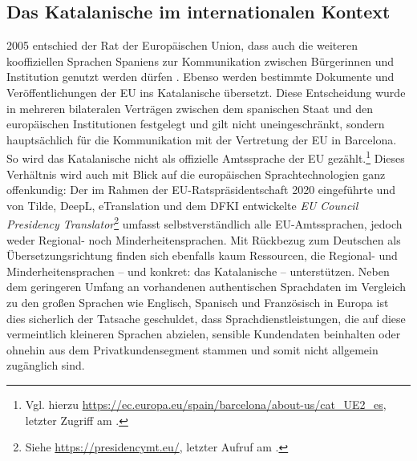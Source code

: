 
\subsection{Das Katalanische im internationalen Kontext}
\label{K2:subsec:KatInt}\largerpage


2005 entschied der Rat der Europäischen Union, dass auch die weiteren kooffiziellen Sprachen Spaniens zur Kommunikation zwischen Bürger{\textperiodcentered}innen und Institution genutzt werden dürfen \citep[11]{moreno_llengua_2012}. Ebenso werden bestimmte Dokumente und Veröffentlichungen der EU ins Katalanische übersetzt. Diese Entscheidung wurde in mehreren bilateralen Verträgen zwischen dem spanischen Staat und den europäischen Institutionen festgelegt und gilt nicht uneingeschränkt, sondern hauptsächlich für die Kommunikation mit der Vertretung der EU in Barcelona. So wird das Katalanische nicht als offizielle Amtssprache der EU gezählt.\footnote{Vgl. hierzu \url{https://ec.europa.eu/spain/barcelona/about-us/cat_UE2_es}, letzter Zugriff am \datum{}.} Dieses Verhältnis wird auch mit Blick auf die europäischen Sprachtechnologien ganz offenkundig: Der im Rahmen der EU-Ratspräsidentschaft 2020 eingeführte und von Tilde, DeepL, eTranslation und dem DFKI entwickelte \emph{EU Council Presidency Translator}\footnote{Siehe \url{https://presidencymt.eu/}, letzter Aufruf am \datum{}.} umfasst selbstverständlich alle EU-Amtssprachen, jedoch weder Regional- noch Minderheitensprachen. Mit Rückbezug zum Deutschen als Übersetzungsrichtung finden sich ebenfalls kaum Ressourcen, die Re\-gio\-nal- und Minderheitensprachen -- und konkret: das Katalanische -- unterstützen. Neben dem geringeren Umfang an vorhandenen authentischen Sprachdaten im Vergleich zu den \glqq großen\grqq{} Sprachen wie Englisch, Spanisch und Französisch in Europa ist dies sicherlich der Tatsache geschuldet, dass Sprachdienstleistungen, die auf diese vermeintlich kleineren Sprachen abzielen, sensible Kundendaten beinhalten oder ohnehin aus dem Privatkundensegment stammen und somit nicht allgemein zugänglich sind.



